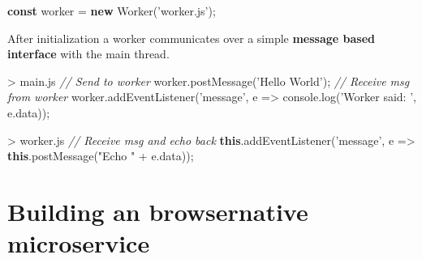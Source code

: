 \documentclass[]{article}
\newenvironment{Shaded}{}{}
\newcommand{\KeywordTok}[1]{\textcolor[rgb]{0.00,0.44,0.13}{\textbf{{#1}}}}
\newcommand{\StringTok}[1]{\textcolor[rgb]{0.25,0.44,0.63}{{#1}}}
\newcommand{\CommentTok}[1]{\textcolor[rgb]{0.38,0.63,0.69}{\textit{{#1}}}}
\newcommand{\VariableTok}[1]{\textcolor[rgb]{0.10,0.09,0.49}{{#1}}}
\newcommand{\OperatorTok}[1]{\textcolor[rgb]{0.40,0.40,0.40}{{#1}}}
\newcommand{\AttributeTok}[1]{\textcolor[rgb]{0.49,0.56,0.16}{{#1}}}
\newcommand{\NormalTok}[1]{{#1}}
\begin{document}
\begin{Shaded}
\begin{Highlighting}[]
\KeywordTok{const} \NormalTok{worker }\OperatorTok{=} \KeywordTok{new} \AttributeTok{Worker}\NormalTok{(}\StringTok{'worker.js'}\NormalTok{)}\OperatorTok{;}
\end{Highlighting}
\end{Shaded}

After initialization a worker communicates over a simple \textbf{message
based interface} with the main thread.

\begin{Shaded}
\begin{Highlighting}[]
\OperatorTok{>} \VariableTok{main}\NormalTok{.}\AttributeTok{js}
\CommentTok{// Send to worker}
\VariableTok{worker}\NormalTok{.}\AttributeTok{postMessage}\NormalTok{(}\StringTok{'Hello World'}\NormalTok{)}\OperatorTok{;}
\CommentTok{// Receive msg from worker}
\VariableTok{worker}\NormalTok{.}\AttributeTok{addEventListener}\NormalTok{(}\StringTok{'message'}\OperatorTok{,} \NormalTok{e }\OperatorTok{=>}
 \VariableTok{console}\NormalTok{.}\AttributeTok{log}\NormalTok{(}\StringTok{'Worker said: '}\OperatorTok{,} \VariableTok{e}\NormalTok{.}\AttributeTok{data}\NormalTok{))}\OperatorTok{;}
\end{Highlighting}
\end{Shaded}

\begin{Shaded}
\begin{Highlighting}[]
\OperatorTok{>} \VariableTok{worker}\NormalTok{.}\AttributeTok{js}
\CommentTok{// Receive msg and echo back}
\KeywordTok{this}\NormalTok{.}\AttributeTok{addEventListener}\NormalTok{(}\StringTok{'message'}\OperatorTok{,} \NormalTok{e }\OperatorTok{=>}
 \KeywordTok{this}\NormalTok{.}\AttributeTok{postMessage}\NormalTok{(}\StringTok{"Echo "} \OperatorTok{+} \VariableTok{e}\NormalTok{.}\AttributeTok{data}\NormalTok{))}\OperatorTok{;}
\end{Highlighting}
\end{Shaded}

\section{Building an browsernative
microservice}\label{building-an-browsernative-microservice}
\end{document}
